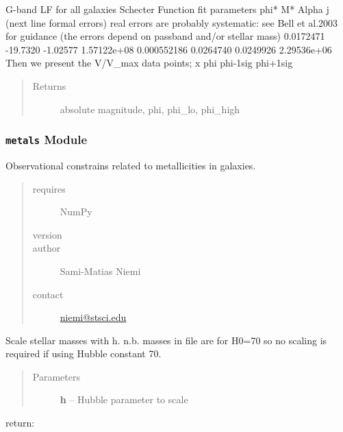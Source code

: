 \documentclass[letterpaper,10pt,english]{sphinxmanual}
\begin{document}
\begin{fulllineitems}
\label{SamPy.astronomy:SamPy.astronomy.luminosityFunctionss.bellG}
G-band LF for all galaxies
Schecter Function fit parameters
phi* M* Alpha j  (next line formal errors)
real errors are probably systematic: see Bell et al.2003 for
guidance (the errors depend on passband and/or stellar mass)
0.0172471     -19.7320     -1.02577  1.57122e+08
0.000552186    0.0264740    0.0249926  2.29536e+06
Then we present the V/V\_max data points; x   phi  phi-1sig  phi+1sig
\begin{quote}\begin{description}
\item[{Returns}] \leavevmode
absolute magnitude, phi, phi\_lo, phi\_high

\end{description}\end{quote}

\end{fulllineitems}



\subsubsection{\texttt{metals} Module}
\label{SamPy.astronomy:module-SamPy.astronomy.metals}\label{SamPy.astronomy:metals-module}
Observational constrains related to metallicities in galaxies.
\begin{quote}\begin{description}
\item[{requires}] \leavevmode
NumPy

\item[{version}] 

\item[{author}] \leavevmode
Sami-Matias Niemi

\item[{contact}] \leavevmode
\href{mailto:niemi@stsci.edu}{niemi@stsci.edu}

\end{description}\end{quote}


\begin{fulllineitems}
\label{SamPy.astronomy:SamPy.astronomy.metals.gallazzi}
Scale stellar masses with h.
n.b. masses in file are for H0=70 so no scaling is required
if using Hubble constant 70.
\begin{quote}\begin{description}
\item[{Parameters}] \leavevmode
\textbf{h} -- Hubble parameter to scale

\end{description}\end{quote}

return:

\end{fulllineitems}
\end{document}
